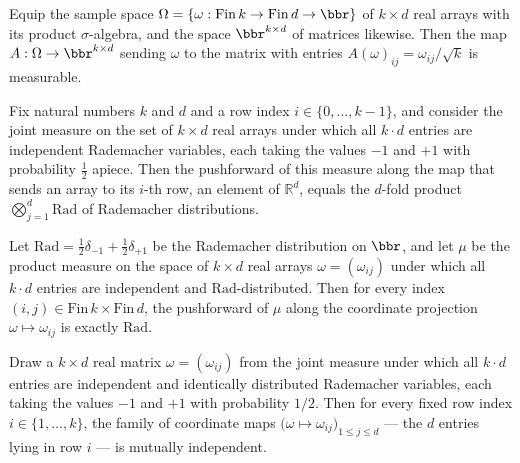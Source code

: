 \begin{lemma}
\label{measurable_radMatrix}
\leanok
{}
Equip the sample space $\Omega = \{\omega : \mathrm{Fin}\,k \to \mathrm{Fin}\,d \to
\bbr\}$ of $k \times d$ real arrays with its product $\sigma$-algebra, and the space
$\bbr^{k \times d}$ of matrices likewise. Then the map $A : \Omega \to \bbr^{k\times d}$
sending $\omega$ to the matrix with entries $A(\omega)_{ij} = \omega_{ij}/\sqrt{k}$ is
measurable.
\end{lemma}

\begin{lemma}
\label{radJointMeasure_row_marginal}
\leanok
{}
Fix natural numbers $k$ and $d$ and a row index $i \in \{0, \dots, k-1\}$, and consider
the joint measure on the set of $k \times d$ real arrays under which all $k \cdot d$
entries are independent Rademacher variables, each taking the values $-1$ and $+1$ with
probability $\tfrac12$ apiece. Then the pushforward of this measure along the map that
sends an array to its $i$-th row, an element of $\mathbb{R}^d$, equals the $d$-fold
product $\bigotimes_{j=1}^{d} \mathrm{Rad}$ of Rademacher distributions.
\end{lemma}

\begin{lemma}
\label{radJointMeasure_entry_marginal}
\leanok
{}
Let $\mathrm{Rad} = \tfrac{1}{2}\delta_{-1} + \tfrac{1}{2}\delta_{+1}$ be the Rademacher
distribution on $\bbr$, and let $\mu$ be the product measure on the space of $k \times
d$ real arrays $\omega = (\omega_{ij})$ under which all $k \cdot d$ entries are
independent and $\mathrm{Rad}$-distributed. Then for every index $(i,j) \in
\mathrm{Fin}\,k \times \mathrm{Fin}\,d$, the pushforward of $\mu$ along the coordinate
projection $\omega \mapsto \omega_{ij}$ is exactly $\mathrm{Rad}$.
\end{lemma}

\begin{lemma}
\label{radJointMeasure_row_iid}
\leanok
{}
Draw a $k \times d$ real matrix $\omega = (\omega_{ij})$ from the joint measure under
which all $k \cdot d$ entries are independent and identically distributed Rademacher
variables, each taking the values $-1$ and $+1$ with probability $1/2$. Then for every
fixed row index $i \in \{1,\dots,k\}$, the family of coordinate maps $\bigl(\omega
\mapsto \omega_{ij}\bigr)_{1 \le j \le d}$ — the $d$ entries lying in row $i$ — is
mutually independent.
\end{lemma}

